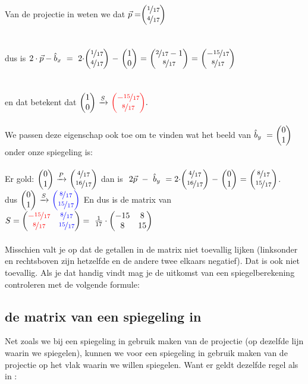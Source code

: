 Van de projectie in \RT weten we dat 
$ \vec{p} = \vectwee{ \nicefrac{1}{17} } { \nicefrac{4}{17} } \  $ \\ \\ \\dus is 
$ 2\cdot \vec{p} -  \hat{b}_x
\  =  \   2\cdot \vectwee{ \nicefrac{1}{17} } { \nicefrac{4}{17} } \ - \ \vectwee{1}{0} 
\ = \    \vectwee{ \nicefrac{2}{17} -1 } {\nicefrac{8}{17}} 
\ = \    \vectwee{ -\nicefrac{15}{17} } {\nicefrac{8}{17}} 
$ \\ \\ \\
en dat betekent dat   $ \vectwee{1}{0}  \  \xrightarrow{S}   
\  \vectwee[red]{ -\nicefrac{15}{17} } {\nicefrac{8}{17}} . $ \\ \\
We passen deze eigenschap ook toe om te vinden wat het beeld van  $  \hat{b}_y\ = \ \vectwee{0}{1} $ onder onze spiegeling is:\\ \\
Er gold:  $ \vectwee{0}{1}   \  \xrightarrow{P}  \ 
\vectwee{\nicefrac{4} {17} } {\nicefrac {16} {17}} $
\qquad  dan is $  \  2\vec{p} \ - \  \hat{b}_y \ 
= 2 \cdot \vectwee{ \nicefrac {4} {17} } { \nicefrac {16} {17}} \ - \ \vectwee{0}{1}  \ 
= \  \vectwee{\nicefrac{8}{17} } {\nicefrac{15}{17}}  $. \\

\quad dus  $ \vectwee{0}{1}   \  \xrightarrow{S}  \
\vectwee[blue]{\nicefrac{8}{17} } {\nicefrac{15}{17} } $ 
\quad \quad En dus is de matrix van 
$ S = \begin{pmatrix}  
	{\color{red} - \nicefrac{15}{17}} & { \color{blue}\nicefrac{8}{17}}  \\  {\color{red} \nicefrac{8}{17} } & { \color{blue} \nicefrac{15}{17} }  \end{pmatrix} 
 = \ \frac{1}{17} \cdot   \begin{pmatrix} -15&8 \\ 8&15 \end{pmatrix} $\\ \\
Misschien valt je op dat de getallen in de matrix niet toevallig lijken (linksonder en rechtsboven zijn hetzelfde en de andere twee elkaars negatief). Dat is ook niet toevallig. Als je dat handig vindt mag je de uitkomst van een spiegelberekening controleren met de volgende formule:\\


\subsection{de matrix van een spiegeling in \RD}
Net zoals we bij een spiegeling in \RT gebruik maken van de projectie (op dezelfde lijn waarin we spiegelen), kunnen we voor een spiegeling in \RD gebruik maken van de projectie op het vlak waarin we willen spiegelen. Want er geldt dezelfde regel als in \RT:\\ \\

